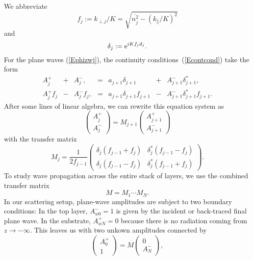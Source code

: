We abbreviate
\begin{equation}
  f_j := k_{\perp j}/K = \sqrt{\overline{n_j^2}-(k_\parallel/K)^2}
\end{equation}
and
\begin{equation}
   \delta_j := \text{e}^{iKf_jd_j}.
\end{equation}
For the plane waves (\ref{Ephizwj}),
the continuity conditions~(\ref{Econtcond}) take the form
\begin{equation}\label{Econt2}
  \begin{array}{lclclcl}
  A^+_j &+& A^-_j,
  &=&
  a_{j+1}\delta_{j+1} &+& A^-_{j+1}\delta_{j+1}^*,
  \\
  A^+_j f_j  &-& A^-_j f_j,
  &=&
 a_{j+1}\delta_{j+1} f_{j+1} &-& A^-_{j+1}\delta_{j+1}^* f_{j+1}.
  \end{array}
\end{equation}
After some lines of linear algebra,
we can rewrite this equation system as
\begin{equation}\label{EcMc}
  \left( \begin{array}{c}A^+_j\\A^-_j\end{array} \right)
  = M_{j+1} \left( \begin{array}{c}A^+_{j+1}\\A^-_{j+1}\end{array} \right)
\end{equation}
with the transfer matrix
\begin{equation}
  M_j
   = \frac{1}{2f_{j-1}}
   \left(\begin{array}{cc}
       \delta_j(f_{j-1}+f_j)&\delta_j^*(f_{j-1}-f_j)\\
       \delta_j(f_{j-1}-f_j)&\delta_j^*(f_{j-1}+f_j)
   \end{array}\right).
\end{equation}
To study wave propagation across the entire stack of layers,
we use the combined transfer matrix
\begin{equation}
   M = M_1 \cdots M_N.
\end{equation}
In our scattering setup,
plane-wave amplitudes are subject to two boundary conditions:
In the top layer, $A^-_{w0}=1$ is given by the
incident or back-traced final plane wave.
In the substrate, $A^+_{wN}=0$ because there is no radiation
coming from $z\to-\infty$.
This leaves us with two unkown amplitudes connected by
\begin{equation}
  \left( \begin{array}{c}A^+_0\\1\end{array} \right)
  = M \left( \begin{array}{c}0\\A^-_N\end{array} \right),
\end{equation}
